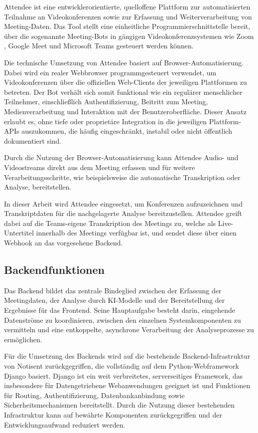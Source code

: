 Attendee ist eine entwicklerorientierte, quelloffene Plattform zur automatisierten Teilnahme an Videokonferenzen sowie zur Erfassung und Weiterverarbeitung von Meeting-Daten. Das Tool stellt eine einheitliche Programmierschnittstelle bereit, über die sogenannte Meeting-Bots in gängigen Videokonferenzsystemen wie Zoom \cite{zoom}, Google Meet \cite{googlemeet} und Microsoft Teams gesteuert werden können. 

Die technische Umsetzung von Attendee basiert auf Browser-Automatisierung. Dabei wird ein realer Webbrowser programmgesteuert verwendet, um Videokonferenzen über die offiziellen Web-Clients der jeweiligen Plattformen zu betreten. Der Bot verhält sich somit funktional wie ein regulärer menschlicher Teilnehmer, einschließlich Authentifizierung, Beitritt zum Meeting, Medienverarbeitung und Interaktion mit der Benutzeroberfläche. Dieser Ansatz erlaubt es, ohne tiefe oder proprietäre Integration in die jeweiligen Plattform-APIs auszukommen, die häufig eingeschränkt, instabil oder nicht öffentlich dokumentiert sind.

Durch die Nutzung der Browser-Automatisierung kann Attendee Audio- und Videostreams direkt aus dem Meeting erfassen und für weitere Verarbeitungsschritte, wie beispielsweise die automatische Transkription oder Analyse, bereitstellen. 

In dieser Arbeit wird Attendee eingesetzt, um Konferenzen aufzuzeichnen und Transkriptdaten für die nachgelagerte Analyse bereitzustellen. Attendee greift dabei auf die Teams-eigene Transkription des Meetings zu, welche als Live-Untertitel innerhalb des Meetings verfügbar ist, und sendet diese über einen Webhook an das vorgesehene Backend.

\subsection{Backendfunktionen}
Das Backend bildet das zentrale Bindeglied zwischen der Erfassung der Meetingdaten, der Analyse durch KI-Modelle und der Bereitstellung der Ergebnisse für das Frontend. Seine Hauptaufgabe besteht darin, eingehende Datenströme zu koordinieren, zwischen den einzelnen Systemkomponenten zu vermitteln und eine entkoppelte, asynchrone Verarbeitung der Analyseprozesse zu ermöglichen. 

Für die Umsetzung des Backends wird auf die bestehende Backend-Infrastruktur von Notisent zurückgegriffen, die vollständig auf dem Python-Webframework Django basiert. Django ist ein weit verbreitetes, serverseitiges Framework, das insbesondere für Datengetriebene Webanwendungen geeignet ist und Funktionen für Routing, Authentifizierung, Datenbankanbindung sowie Sicherheitsmechanismen bereitstellt. Durch die Nutzung dieser bestehenden Infrastruktur kann auf bewährte Komponenten zurückgegriffen und der Entwicklungsaufwand reduziert werden. 

